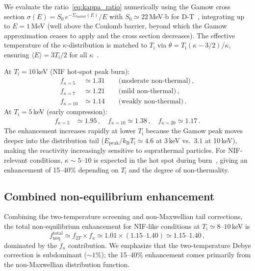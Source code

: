 \documentclass[prc,twocolumn,superscriptaddress,longbibliography,floatfix]{revtex4-2}
\newcommand{\kB}{k_{\mathrm{B}}}
\newcommand{\Sbar}{\Sigma_{\mathrm{barrier}}}
\newcommand{\fneq}{f_{\mathrm{neq}}}
\newcommand{\Ep}{E_{\mathrm{peak}}}
\newcommand{\Ti}{T_{\mathrm{i}}}
\begin{document}
We evaluate the ratio~\eqref{eq:kappa_ratio} numerically using the
Gamow cross section $\sigma(E) = S_{0}\,e^{-\Sbar(E)}/E$ with
$S_{0}\simeq 22\,$MeV$\cdot$b for D-T~\cite{Bosch1992}, integrating up
to $E = 1\,$MeV (well above the Coulomb barrier, beyond which the
Gamow approximation ceases to apply and the cross section
decreases).  The effective temperature of the $\kappa$-distribution is
matched to $\Ti$ via $\theta = \Ti(\kappa-3/2)/\kappa$, ensuring
$\langle E\rangle = 3\Ti/2$ for all $\kappa$~\cite{Du2013}.

At $\Ti = 10\,$keV (NIF hot-spot peak burn):
\begin{align}
f_{\kappa=5} &\simeq 1.31\qquad\text{(moderate non-thermal)}\,,\\
f_{\kappa=7} &\simeq 1.21\qquad\text{(mild non-thermal)}\,,\\
f_{\kappa=10} &\simeq 1.14\qquad\text{(weakly non-thermal)}\,.
\label{eq:kappa_approx}
\end{align}
At $\Ti = 5\,$keV (early compression):
\begin{align}
f_{\kappa=5} &\simeq 1.95\,,\quad
f_{\kappa=10} \simeq 1.38\,,\quad
f_{\kappa=20} \simeq 1.17\,.
\end{align}
The enhancement increases rapidly at lower $\Ti$ because the Gamow peak
moves deeper into the distribution tail ($\Ep/\kB\Ti \simeq 4.6$ at
3\,keV vs.\ $3.1$ at 10\,keV), making the reactivity increasingly
sensitive to suprathermal particles.  For NIF-relevant conditions,
$\kappa \sim 5$--$10$ is expected in the hot spot during
burn~\cite{Kato1991,Atzeni2004}, giving an enhancement of 15--40\%
depending on $\Ti$ and the degree of non-thermality.

\subsection{Combined non-equilibrium enhancement}

Combining the two-temperature screening and non-Maxwellian
tail corrections, the total non-equilibrium enhancement for
NIF-like conditions at $\Ti \simeq 8$--$10\,$keV is
\begin{equation}
\fneq^{\mathrm{total}} \simeq f_{2T}\times f_{\kappa}
\simeq 1.01 \times (1.15\text{--}1.40) \simeq 1.15\text{--}1.40\,,
\label{eq:total_enhancement}
\end{equation}
dominated by the $f_{\kappa}$ contribution.  We emphasize that the
two-temperature Debye correction is subdominant ($\sim 1\%$); the
15--40\% enhancement comes primarily from the non-Maxwellian
distribution function.
\end{document}

